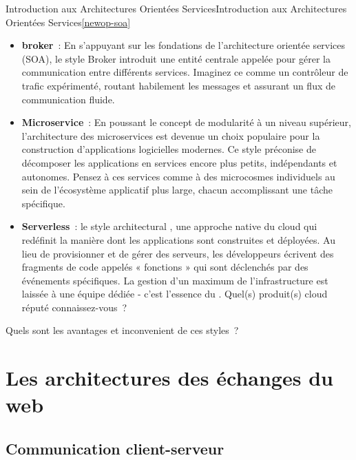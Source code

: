 \documentclass{beamer}
\begin{document}
    \begin{frame}{Introduction aux Architectures Orientées Services}{Introduction aux Architectures Orientées Services\cref{newop-soa}}
        \begin{footnotesize}
            \begin{itemize}
                \item \textbf{broker}~: En s'appuyant sur les fondations de l'architecture orientée services (SOA), le style Broker introduit une entité centrale appelée  pour gérer la communication entre différents services.
                Imaginez ce  comme un contrôleur de trafic expérimenté, routant habilement les messages et assurant un flux de communication fluide.
                \item \textbf{Microservice}~: En poussant le concept de modularité à un niveau supérieur, l'architecture des microservices est devenue un choix populaire pour la construction d'applications logicielles modernes.
                Ce style préconise de décomposer les applications en services encore plus petits, indépendants et autonomes.
                Pensez à ces services comme à des microcosmes individuels au sein de l'écosystème applicatif plus large, chacun accomplissant une tâche spécifique.
                \item \textbf{Serverless}~: le style architectural , une approche native du cloud qui redéfinit la manière dont les applications sont construites et déployées.
                Au lieu de provisionner et de gérer des serveurs, les développeurs écrivent des fragments de code appelés « fonctions » qui sont déclenchés par des événements spécifiques.
                La gestion d'un maximum de l'infrastructure est laissée à une équipe dédiée - c'est l'essence du .
                Quel(s) produit(s) cloud  réputé connaissez-vous~?
            \end{itemize}
            Quels sont les avantages et inconvenient de ces styles~?
        \end{footnotesize}
    \end{frame}


    \section{Les architectures des échanges du web}\label{sec:web-com}

    \subsection{Communication client-serveur}\label{subsec:web-com-server-client}
\end{document}
